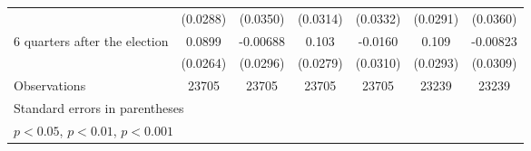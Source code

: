\begin{table}[htbp]
\begin{tabular}{l*{6}{c}}
                    &    (0.0288)         &    (0.0350)         &    (0.0314)         &    (0.0332)         &    (0.0291)         &    (0.0360)         \\
[1em]
 6 quarters after the election&      0.0899\sym{***}&    -0.00688         &       0.103\sym{***}&     -0.0160         &       0.109\sym{***}&    -0.00823         \\
                    &    (0.0264)         &    (0.0296)         &    (0.0279)         &    (0.0310)         &    (0.0293)         &    (0.0309)         \\
\hline
Observations        &       23705         &       23705         &       23705         &       23705         &       23239         &       23239         \\
\hline\hline
\multicolumn{7}{l}{\footnotesize Standard errors in parentheses}\\
\multicolumn{7}{l}{\footnotesize \sym{*} \(p<0.05\), \sym{**} \(p<0.01\), \sym{***} \(p<0.001\)}\\
\end{tabular}
\end{table}
